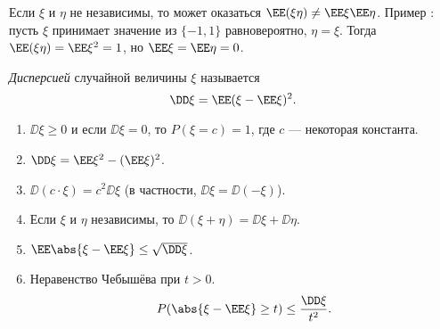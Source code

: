     Если $\xi$ и $\eta$ не независимы, то может оказаться $\EE (\xi\eta) \neq \EE \xi \EE \eta$. Пример : пусть $\xi$ принимает значение из $\{-1, 1\}$ равновероятно, $\eta = \xi$. Тогда
     $\EE (\xi\eta) = \EE \xi^2 = 1$, но $\EE \xi = \EE \eta = 0$.


 \begin{definition}\textit{Дисперсией} случайной величины $\xi$ называется
     $$\DD \xi = \EE (\xi - \EE \xi)^2.$$
 \end{definition}

 \begin{properties}[дисперсии]
\enewline
     \begin{enumerate}
         \item $\DD \xi\ge0$ и если $\DD \xi = 0$, то $P(\xi = c) = 1$, где $c$ --- некоторая константа. 
         \item $\DD \xi = \EE \xi^2 - (\EE \xi)^2$.

               
         \item $\DD (c \cdot \xi) = c^2\DD \xi$ (в частности, $\DD \xi = \DD (-\xi)$).


         \item Если $\xi$ и $\eta$ независимы, то $\DD (\xi+\eta) = \DD \xi+\DD \eta$.


         \item $\EE \abs{\xi - \EE \xi}\le \sqrt{\DD \xi}$.


         \item Неравенство Чебышёва при $t > 0$.
               $$P(\abs{\xi - \EE \xi} \ge t)\le \frac{\DD \xi}{t^2}.$$
               

     \end{enumerate}
 \end{properties}

